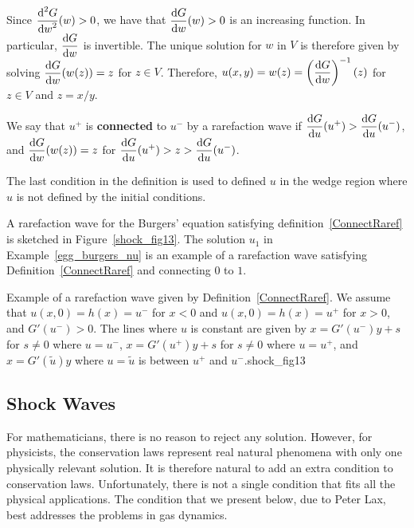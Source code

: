 Since $\displaystyle \frac{\displaystyle \mathrm{d}^{2}{G}} {\displaystyle \mathrm{d}{w}^{2}}(w) > 0$, we have that
$\displaystyle \frac{\mathrm{d}G}{\mathrm{d}{w}}(w) > 0$ is an increasing function.
In particular, $\displaystyle \frac{\mathrm{d}G}{\mathrm{d}{w}}$ is invertible.  The
unique solution for $w$ in $V$ is therefore given by solving
$\displaystyle \frac{\mathrm{d}G}{\mathrm{d}{w}}(w(z)) = z$ for $z \in V$.
Therefore, $\displaystyle u(x,y) = w(z) = \left(\frac{\mathrm{d}G}{\mathrm{d}{w}}\right)^{-1}(z)$
for $z \in V$ and $z = x/y$.

\begin{defn} \label{ConnectRaref}
We say that $\displaystyle u^+$ is {\bfseries connected} to
$\displaystyle u^-$ by a rarefaction
wave if $\displaystyle \frac{\mathrm{d}G}{\mathrm{d}{u}}(u^+) > \frac{\mathrm{d}G}{\mathrm{d}{u}}(u^-)$, and
$\displaystyle \frac{\mathrm{d}G}{\mathrm{d}{w}}(w(z)) = z$ for
$\displaystyle \frac{\mathrm{d}G}{\mathrm{d}{u}}(u^+) > z > \frac{\mathrm{d}G}{\mathrm{d}{u}}(u^-)$.
\end{defn}

The last condition in the definition is used to defined $u$ in the
wedge region where $u$ is not defined by the initial conditions.

A rarefaction wave for the Burgers' equation satisfying
definition~\ref{ConnectRaref} is sketched in Figure~\ref{shock_fig13}.
The solution $u_1$ in Example~\ref{egg_burgers_nu} is an example of a
rarefaction wave satisfying Definition~\ref{ConnectRaref} and
connecting $0$ to $1$.

{Example of a rarefaction wave given by Definition~\ref{ConnectRaref}.
We assume that $\displaystyle u(x,0) = h(x) = u^-$ for $x<0$ and
$\displaystyle u(x,0) = h(x) = u^+$ for $x>0$, and
$\displaystyle G'(u^-)>0$.  The lines where $u$
is constant are given by $x= G'(u^-) y + s$ for $s\neq 0$ where $u = u^-$,
$x= G'(u^+) y + s$ for $s\neq 0$ where $u = u^+$,
and $x = G'(\tilde{u}) y$ where $u = \tilde{u}$ is between
$\displaystyle u^+$ and $\displaystyle u^-$.}{shock_fig13}

\subsection{Shock Waves}

For mathematicians, there is no reason to reject any
solution.  However, for physicists, the conservation laws represent
real natural phenomena with only one physically relevant solution.  It
is therefore natural to add an extra condition to conservation laws.
Unfortunately, there is not a single condition that fits all the
physical applications.  The condition that we present below, due to
Peter Lax, best addresses the problems in gas dynamics.

